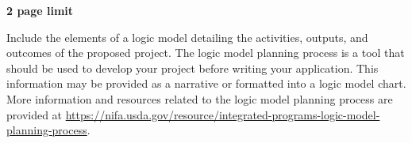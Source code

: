 \documentclass[12pt,letterpaper]{article}
\title{\ruleline{Logic Model}}
\begin{document}
\maketitle
\linenumbers

\textbf{2 page limit}

Include the elements of a logic model detailing the activities, outputs, and
outcomes of the proposed project. The logic model planning process is a tool
that should be used to develop your project before writing your application.
This information may be provided as a narrative or formatted into a logic model
chart. More information and resources related to the logic model planning
process are provided at
\url{https://nifa.usda.gov/resource/integrated-programs-logic-model-planning-process}.
\end{document}
